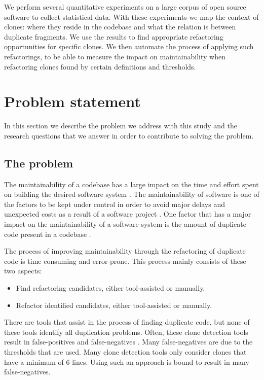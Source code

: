 We perform several quantitative experiments on a large corpus of open source software to collect statistical data. With these experiments we map the context of clones: where they reside in the codebase and what the relation is between duplicate fragments. We use the results to find appropriate refactoring opportunities for specific clones. We then automate the process of applying such refactorings, to be able to measure the impact on maintainability when refactoring clones found by certain definitions and thresholds.

\section{Problem statement}
In this section we describe the problem we address with this study and the research questions that we answer in order to contribute to solving the problem.

\subsection{The problem}
The maintainability of a codebase has a large impact on the time and effort spent on building the desired software system \cite{bakota2012cost, munson1978software}. The maintainability of software is one of the factors to be kept under control in order to avoid major delays and unexpected costs as a result of a software project \cite{fowler2018refactoring}. One factor that has a major impact on the maintainability of a software system is the amount of duplicate code present in a codebase \cite{heitlager2007practical, fowler1999refactoring}.

The process of improving maintainability through the refactoring of duplicate code is time consuming and error-prone. This process mainly consists of these two aspects:
\begin{itemize}
	\item Find refactoring candidates, either tool-assisted or manually.
	\item Refactor identified candidates, either tool-assisted or manually.
\end{itemize}
There are tools that assist in the process of finding duplicate code, but none of these tools identify all duplication problems. Often, these clone detection tools result in false-positives and false-negatives \cite{roy2007survey}. Many false-negatives are due to the thresholds that are used. Many clone detection tools \cite{sajnani2016sourcerercc, svajlenko2016bigcloneeval} only consider clones that have a minimum of 6 lines. Using such an approach is bound to result in many false-negatives.

